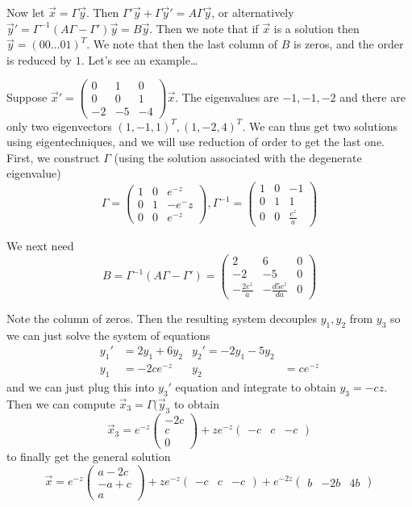 \documentclass[10pt]{report}
\newcommand{\rd}[2]{\frac{d#1}{d#2}}
\begin{document}
Now let $\vec{x} = \Gamma \vec{y}$. Then $\Gamma' \vec{y} + \Gamma \vec{y}' = A\Gamma\vec{y}$, or alternatively $\vec{y}' = \Gamma^{-1}(A\Gamma - \Gamma')\vec{y} = B\vec{y}$. Then we note that if $\vec{x}$ is a solution then $\vec{y} = (00\dots01)^T$. We note that then the last column of $B$ is zeros, and the order is reduced by $1$. Let's see an example\dots

Suppose $\vec{x}' = \begin{pmatrix} 0 & 1 & 0\\0 &  0 & 1\\-2 & -5 & -4 \end{pmatrix} \vec{x}$. The eigenvalues are $-1, -1, -2$ and there are only two eigenvectors $(1,-1,1)^T, (1,-2,4)^T$. We can thus get two solutions using eigentechniques, and we will use reduction of order to get the last one. First, we construct $\Gamma$ (using the solution associated with the degenerate eigenvalue)
$$\Gamma = \begin{pmatrix} 1 & 0 & e^{-z} \\0 & 1 & -e^-z\\ 0 & 0 & e^{-z}\end{pmatrix}, \Gamma^{-1} = \begin{pmatrix} 1 & 0 & -1\\0 & 1 & 1\\0 & 0 & \frac{e^z}{a} \end{pmatrix} $$

We next need 
$$B = \Gamma^{-1}\left( A\Gamma - \Gamma' \right) = \begin{pmatrix} 2 & 6 & 0\\-2 & -5 & 0\\-\frac{2e^z}{a} & -\rd{5e^z}{a}&0 \end{pmatrix} $$

Note the column of zeros. Then the resulting system decouples $y_1, y_2$ from $y_3$ so we can just solve the system of equations
\begin{align}
    y_1' &= 2y_1 + 6y_2 & y_2' = -2y_1 - 5y_2\\
    y_1 &= -2ce^{-z} & y_2 &= ce^{-z}
\end{align}
and we can just plug this into $y_3'$ equation and integrate to obtain $y_3 = -cz$. Then we can compute $\vec{x}_3 = \Gamma(\vec{y}_3$ to obtain 
$$\vec{x}_3 = e^{-z}\begin{pmatrix} -2c\\c\\0 \end{pmatrix} + ze^{-z}\begin{pmatrix} -c & c & -c \end{pmatrix} $$
to finally get the general solution
$$\vec{x} = e^{-z}\begin{pmatrix} a-2c\\-a+c\\a \end{pmatrix}  + ze^{-z}\begin{pmatrix} -c & c & -c \end{pmatrix} + e^{-2z}\begin{pmatrix} b & -2b & 4b \end{pmatrix} $$
\end{document}

